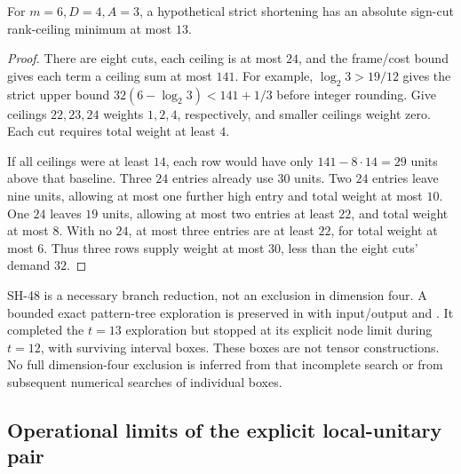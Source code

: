 \begin{lemma}
\label{lem:dimension-four-three-summand-minimum}
For $m=6,D=4,A=3$, a hypothetical strict shortening
has an absolute sign-cut rank-ceiling minimum at
most $13$.
\end{lemma}
\begin{proof}
There are eight cuts, each ceiling is at most $24$,
and the frame/cost bound gives each term a ceiling
sum at most $141$.  For example,
$\log_2 3>19/12$ gives the strict upper bound
$32(6-\log_2 3)<141+1/3$ before integer rounding.
Give ceilings $22,23,24$ weights $1,2,4$,
respectively, and smaller ceilings weight zero.
Each cut requires total weight at least $4$.

If all ceilings were at least $14$, each row
would have only $141-8\cdot14=29$ units above
that baseline.  Three $24$ entries already use
$30$ units.  Two $24$ entries leave nine units,
allowing at most one further high entry and
total weight at most $10$.  One $24$ leaves
$19$ units, allowing at most two entries at
least $22$, and total weight at most $8$.
With no $24$, at most three entries are at
least $22$, for total weight at most $6$.
Thus three rows supply weight at most $30$,
less than the eight cuts' demand $32$.
\end{proof}

SH-48 is a necessary branch reduction, not an
exclusion in dimension four.  A bounded exact
pattern-tree exploration is preserved in
with input/output
 and
.
It completed the $t=13$ exploration but stopped
at its explicit node limit during $t=12$, with
surviving interval boxes.  These boxes are not
tensor constructions.  No full dimension-four
exclusion is inferred from that incomplete search
or from subsequent numerical searches of individual
boxes.

\subsection{Operational limits of the explicit local-unitary pair}

